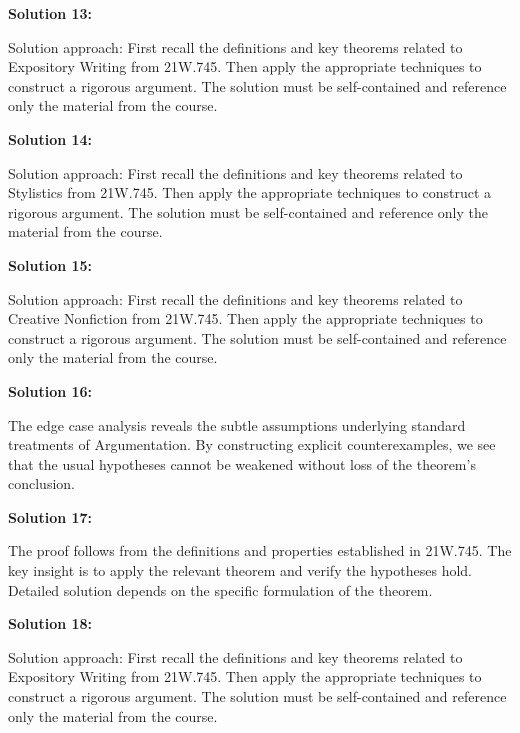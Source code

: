 \documentclass[12pt,a4paper]{exam}
\begin{document}
\vspace{0.5cm}

\textbf{Solution 13:}

Solution approach: First recall the definitions and key theorems related to Expository Writing from 21W.745. Then apply the appropriate techniques to construct a rigorous argument. The solution must be self-contained and reference only the material from the course.

\vspace{0.5cm}

\textbf{Solution 14:}

Solution approach: First recall the definitions and key theorems related to Stylistics from 21W.745. Then apply the appropriate techniques to construct a rigorous argument. The solution must be self-contained and reference only the material from the course.

\vspace{0.5cm}

\textbf{Solution 15:}

Solution approach: First recall the definitions and key theorems related to Creative Nonfiction from 21W.745. Then apply the appropriate techniques to construct a rigorous argument. The solution must be self-contained and reference only the material from the course.

\vspace{0.5cm}

\textbf{Solution 16:}

The edge case analysis reveals the subtle assumptions underlying standard treatments of Argumentation. By constructing explicit counterexamples, we see that the usual hypotheses cannot be weakened without loss of the theorem's conclusion.

\vspace{0.5cm}

\textbf{Solution 17:}

The proof follows from the definitions and properties established in 21W.745. The key insight is to apply the relevant theorem and verify the hypotheses hold. Detailed solution depends on the specific formulation of the theorem.

\vspace{0.5cm}

\textbf{Solution 18:}

Solution approach: First recall the definitions and key theorems related to Expository Writing from 21W.745. Then apply the appropriate techniques to construct a rigorous argument. The solution must be self-contained and reference only the material from the course.
\end{document}
